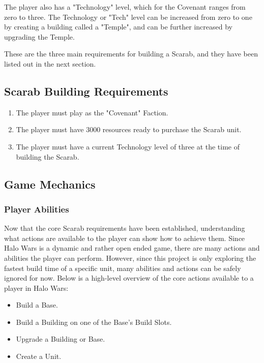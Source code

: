 \documentclass[a4paper, 12pt, english]{article}
\begin{document}
The player also has a "Technology" level, which for the Covenant ranges from zero to three. The Technology or "Tech" level can be increased from zero to one by creating a building called a "Temple", and can be further increased by upgrading the Temple. 
\newline

These are the three main requirements for building a Scarab, and they have been listed out in the next section.

\subsection{Scarab Building Requirements}


 \begin{enumerate}
   \item The player must play as the "Covenant" Faction.
    \item The player must have 3000 resources ready to purchase the Scarab unit.
    \item The player must have a current Technology level of three at the time of building the Scarab.
    \end{enumerate}

    

\subsection{Game Mechanics}
\subsubsection{Player Abilities}
Now that the core Scarab requirements have been established, understanding what actions are available to the player can show how to achieve them. Since Halo Wars is a dynamic and rather open ended game, there are many actions and abilities the player can perform. However, since this project is only exploring the fastest build time of a specific unit, many abilities and actions can be safely ignored for now. Below is a high-level overview of the core actions available to a player in Halo Wars:
		\begin{itemize}
        \item Build a Base.
        \item Build a Building on one of the Base's Build Slots.
        \item Upgrade a Building or Base.
        \item Create a Unit.
  		\end{itemize}
\end{document}
